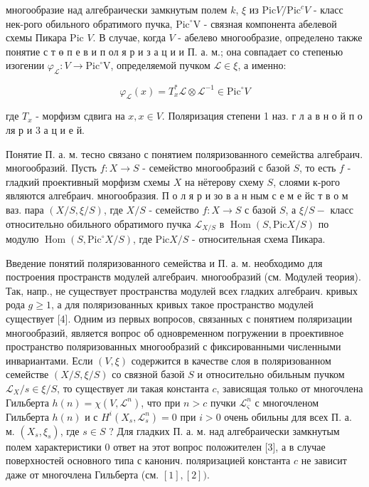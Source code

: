 \documentclass[10pt]{article}
\begin{document}
многообразие над алгебраически замкнутым полем $k$, $\xi$ из $\mathrm{Pic} V / \mathrm{Pic}^{c} V$ - класс нек-рого обильного обратимого пучка, $\mathrm{Pic}^{\circ} \mathrm{V}$ - связная компонента абелевой схемы Пикара Pic $V$. В случае, когда $V$ - абелево многообразие, определено также понятие с т ө п е в и п ол я р и з а ц и и П. а. м.; она совпадает со степенью изогении $\varphi_{\mathscr{L}}: V \rightarrow \mathrm{Pic}^{\circ} \mathrm{V}$, определяемой пучком $\mathscr{L} \in \xi$, а именно:



\[

\varphi_{\mathscr{L}}(x)=T_{x}^{*} \mathscr{L} \otimes \mathscr{L}^{-1} \in \mathrm{Pic}^{\circ} V

\]



где $T_{x}$ - морфизм сдвига на $x, x \in V$. Поляризация степени 1 наз. $г$ л а в н о й п о ля р и 3 а ц и е й.



Понятие П. а. м. тесно связано с понятием поляризованного семейства алгебраич. многообразий. Пусть $f: X \rightarrow S$ - семейство многообразий с базой $S$, то есть $f$ - гладкий проективный морфизм схемы $X$ на нётерову схему $S$, слоями к-рого являются алгебраич. многообразия. П о л я р и зо в а н ным с е м е йс т в о м ваз. пара $(X / S, \xi / S)$, где $X / S$ - семейство $f: X \rightarrow S$ с базой $S$, а $\xi / S-$ класс относительно обильного обратимого пучка $\mathscr{L}_{X / S}$ в $\operatorname{Hom}(S, \mathrm{Pic} X / S)$ по модулю $\operatorname{Hom}\left(S, \mathrm{Pic}^{\circ} X / S\right)$, где $\mathrm{Pic} X / S$ - относительная схема Пикара.



Введение понятий поляризованного семейства и П. а. м. необходимо для построения пространств модулей алгебраич. многообразий (см. Модулей теория). Так, напр., не существует пространства модулей всех гладких алгебраич. кривых рода $g \geqslant 1$, а для поляризованных кривых такое пространство модулей существует [4]. Одним из первых вопросов, связанных с понятием поляризации многообразий, является вопрос об одновременном погружении в проективное пространство поляризованных многообразий с фиксированными численными инвариантами. Если $(V, \xi)$ содержится в качестве слоя в поляризованном семействе $(X / S, \xi / S)$ со связной базой $S$ и относительно обильным пучком $\mathscr{L}_{X} / s \in \xi / S$, то существует ли такая константа $c$, зависящая только от многочлена Гильберта $h(n)=\chi\left(V, \mathscr{L}^{n}\right)$, что при $n>c$ пучки $\mathscr{L}_{\varsigma}^{n}$ с многочленом Гильберта $h(n)$ и с $H^{i}\left(X_{s}, \mathscr{L}_{s}^{n}\right)=0$ при $i>0$ очень обильны для всех П. а. м. $\left(X_{s}, \xi_{s}\right)$, где $s \in S$ ? Для гладких П. а. м. над алгебраически замкнутым полем характеристики 0 ответ на этот вопрос положителен [3], а в случае поверхностей основного типа с канонич. поляризацией константа $c$ не зависит даже от многочлена Гильберта (см. $[1],[2])$.
\end{document}
